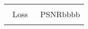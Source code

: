 \begin{tabular}{c c c c c c c c c}
	\\ \\
	
	
	
	\multicolumn{4}{c}{Loss}  &  \multicolumn{5}{c}{PSNR{\color{white}bbbb}}
	
	\\
	
	\multicolumn{4}{c}{}
	&
	\multicolumn{5}{c}{}
\end{tabular}